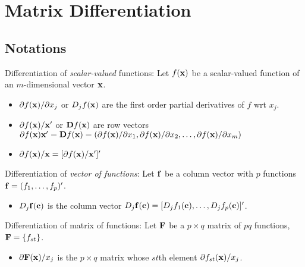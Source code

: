 \documentclass[a4paper, oneside]{book}
\begin{document}
\chapter{Matrix Differentiation}

\section{Notations}

Differentiation of \textit{scalar-valued} functions: Let $f(\mathbf{x})$ be a scalar-valued function of an $m$-dimensional vector $\mathbf{x}$.
\begin{itemize}
\item $\partial f(\mathbf{x})/\partial x_j$ or $D_jf(\mathbf{x})$ are the first order partial derivatives of $f$ wrt $x_j$.
\item $\partial f(\mathbf{x})/\mathbf{x}'$ or $\mathbf{D}f({\mathbf{x}})$ are row vectors $\partial f(\mathbf{x})\mathbf{x}' = \mathbf{D}f({\mathbf{x}})=(\partial f(\mathbf{x})/\partial x_1, \partial f(\mathbf{x})/\partial x_2, \hdots, \partial f(\mathbf{x})/\partial x_m)$
\item $\partial f(\mathbf{x})/\mathbf{x} = [\partial f(\mathbf{x})/\mathbf{x}']'$ 
\end{itemize}
%
%
Differentiation of \textit{vector of functions}: Let $\mathbf{f}$ be a column vector with $p$ functions $\mathbf{f}=(f_1, \hdots, f_p)'$.
\begin{itemize}
\item $D_j\mathbf{f(c)}$ is the column vector $D_j\mathbf{f(c)}=[D_jf_1(\mathbf{c}), \hdots, D_jf_p(\mathbf{c})]'$.
\end{itemize}
%
%
Differentiation of matrix of functions: Let $\mathbf{F}$ be a $p\times q$ matrix of $pq$ functions,  $\mathbf{F}=\{f_{st}\}$.
\begin{itemize}
\item $\partial \mathbf{F(x)}/x_j$ is the $p\times q$ matrix whose $st$th element $\partial f_{st}\mathbf{(x)}/x_j$.
\end{itemize}
\end{document}
